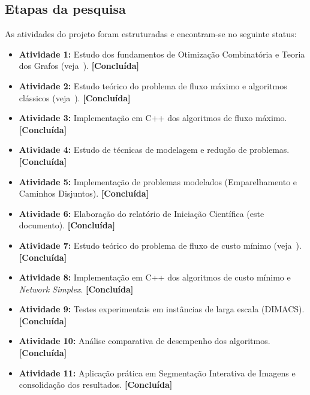\subsection{Etapas da pesquisa}
As atividades do projeto foram estruturadas e encontram-se no seguinte status:
\begin{itemize}[leftmargin=1.5em, itemsep=0.1em, topsep=0.15em, parsep=0em]
    \item \textbf{Atividade 1:} Estudo dos fundamentos de Otimização Combinatória e Teoria dos Grafos (veja~\cite{cook1998combinatorial}). \textbf{[Concluída]}
    \item \textbf{Atividade 2:} Estudo teórico do problema de fluxo máximo e algoritmos clássicos (veja~\cite{ford1956maximal, edmonds1972theoretical, dinic1970algorithm, goldberg1988new}). \textbf{[Concluída]}
    \item \textbf{Atividade 3:} Implementação em C++ dos algoritmos de fluxo máximo. \textbf{[Concluída]}
    \item \textbf{Atividade 4:} Estudo de técnicas de modelagem e redução de problemas. \textbf{[Concluída]}
    \item \textbf{Atividade 5:} Implementação de problemas modelados (Emparelhamento e Caminhos Disjuntos). \textbf{[Concluída]}
    \item \textbf{Atividade 6:} Elaboração do relatório de Iniciação Científica (este documento). \textbf{[Concluída]}
    \item \textbf{Atividade 7:} Estudo teórico do problema de fluxo de custo mínimo (veja~\cite{ahuja1993network}). \textbf{[Concluída]}
    \item \textbf{Atividade 8:} Implementação em C++ dos algoritmos de custo mínimo e \textit{Network Simplex}. \textbf{[Concluída]}
    \item \textbf{Atividade 9:} Testes experimentais em instâncias de larga escala (DIMACS). \textbf{[Concluída]}
    \item \textbf{Atividade 10:} Análise comparativa de desempenho dos algoritmos. \textbf{[Concluída]}
    \item \textbf{Atividade 11:} Aplicação prática em Segmentação Interativa de Imagens e consolidação dos resultados. \textbf{[Concluída]}
\end{itemize}
